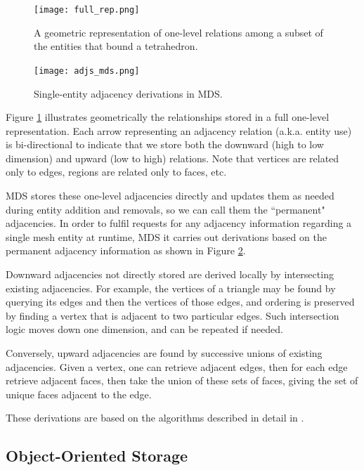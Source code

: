 \begin{figure}
\begin{center}
\texttt{[image: full\_rep.png]}
\caption{A geometric representation of one-level
relations among a subset of the entities that bound a tetrahedron.}
\label{fig:mds_topo}
\end{center}
\end{figure}

\begin{figure}
\begin{center}
\texttt{[image: adjs\_mds.png]}
\caption{Single-entity adjacency derivations in MDS.}
\label{fig:adjs_mds}
\end{center}
\end{figure}

Figure \ref{fig:mds_topo} illustrates geometrically the relationships
stored in a full one-level representation.
Each arrow representing an adjacency relation (a.k.a. entity use)
is bi-directional to indicate that we store both the
downward (high to low dimension) and upward (low to high) relations.
Note that vertices are related only to edges,
regions are related only to faces, etc.

MDS stores these one-level adjacencies directly
and updates them as needed during entity addition and removals,
so we can call them the ``permanent" adjacencies.
In order to fulfil requests for any adjacency information regarding a single
mesh entity at runtime,
MDS it carries out derivations based on the permanent adjacency information
as shown in Figure \ref{fig:adjs_mds}.

Downward adjacencies not directly stored are derived
locally by intersecting existing adjacencies.
For example, the vertices of a triangle may be found
by querying its edges and then the vertices of those
edges, and ordering is preserved by finding a vertex
that is adjacent to two particular edges.
Such intersection logic moves down one dimension, and
can be repeated if needed.

Conversely, upward adjacencies are found by successive
unions of existing adjacencies.
Given a vertex, one can retrieve adjacent edges, then
for each edge retrieve adjacent faces, then take the
union of these sets of faces, giving the set of unique
faces adjacent to the edge.

These derivations are based on the algorithms described
in detail in \cite{seol2005fmdb}.

\subsection{Object-Oriented Storage}
\label{sec:sisc_oo}

